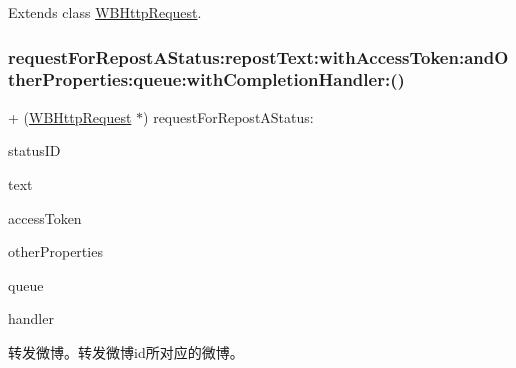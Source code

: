 Extends class \mbox{\hyperlink{interface_w_b_http_request_ae32a41361851196fcf0ffc22b4354581}{W\+B\+Http\+Request}}.

\mbox{\label{category_w_b_http_request_07_weibo_share_08_ae32a41361851196fcf0ffc22b4354581}} 
\subsubsection{\texorpdfstring{request\+For\+Repost\+A\+Status\+:repost\+Text\+:with\+Access\+Token\+:and\+Other\+Properties\+:queue\+:with\+Completion\+Handler\+:()}{requestForRepostAStatus:repostText:withAccessToken:andOtherProperties:queue:withCompletionHandler:()}\hspace{0.1cm}{\footnotesize\ttfamily [3/3]}}
{\footnotesize\ttfamily + (\mbox{\hyperlink{interface_w_b_http_request}{W\+B\+Http\+Request}} $\ast$) request\+For\+Repost\+A\+Status\+: \begin{DoxyParamCaption}\item[{(N\+S\+String $\ast$)}]{status\+ID }\item[{repostText:(N\+S\+String $\ast$)}]{text }\item[{withAccessToken:(N\+S\+String $\ast$)}]{access\+Token }\item[{andOtherProperties:(N\+S\+Dictionary $\ast$)}]{other\+Properties }\item[{queue:(N\+S\+Operation\+Queue $\ast$)}]{queue }\item[{withCompletionHandler:(W\+B\+Request\+Handler)}]{handler }\end{DoxyParamCaption}}

转发微博。转发微博id所对应的微博。


